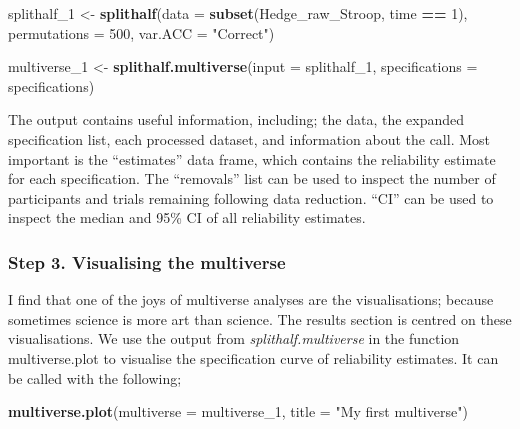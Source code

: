 \documentclass[english,man,floatsintext]{apa6}
\newenvironment{Shaded}{\begin{snugshade}}{\end{snugshade}}
\newcommand{\DataTypeTok}[1]{\textcolor[rgb]{0.13,0.29,0.53}{#1}}
\newcommand{\DecValTok}[1]{\textcolor[rgb]{0.00,0.00,0.81}{#1}}
\newcommand{\KeywordTok}[1]{\textcolor[rgb]{0.13,0.29,0.53}{\textbf{#1}}}
\newcommand{\NormalTok}[1]{#1}
\newcommand{\OperatorTok}[1]{\textcolor[rgb]{0.81,0.36,0.00}{\textbf{#1}}}
\newcommand{\StringTok}[1]{\textcolor[rgb]{0.31,0.60,0.02}{#1}}
\begin{document}
\begin{Shaded}
\begin{Highlighting}[]
\NormalTok{splithalf_}\DecValTok{1}\NormalTok{ <-}\StringTok{ }\KeywordTok{splithalf}\NormalTok{(}\DataTypeTok{data =} \KeywordTok{subset}\NormalTok{(Hedge_raw_Stroop, time }\OperatorTok{==}\StringTok{ }\DecValTok{1}\NormalTok{),}
                         \DataTypeTok{permutations =} \DecValTok{500}\NormalTok{,}
                         \DataTypeTok{var.ACC =} \StringTok{"Correct"}\NormalTok{)}

\NormalTok{multiverse_}\DecValTok{1}\NormalTok{ <-}\StringTok{ }\KeywordTok{splithalf.multiverse}\NormalTok{(}\DataTypeTok{input =}\NormalTok{ splithalf_}\DecValTok{1}\NormalTok{,}
                 \DataTypeTok{specifications =}\NormalTok{ specifications)}
\end{Highlighting}
\end{Shaded}

The output contains useful information, including; the data, the expanded specification list, each processed dataset, and information about the call. Most important is the \enquote{estimates} data frame, which contains the reliability estimate for each specification. The \enquote{removals} list can be used to inspect the number of participants and trials remaining following data reduction. \enquote{CI} can be used to inspect the median and 95\% CI of all reliability estimates.

\hypertarget{step-3.-visualising-the-multiverse}{%
\subsubsection{Step 3. Visualising the multiverse}\label{step-3.-visualising-the-multiverse}}

I find that one of the joys of multiverse analyses are the visualisations; because sometimes science is more art than science. The results section is centred on these visualisations. We use the output from \emph{splithalf.multiverse} in the function multiverse.plot to visualise the specification curve of reliability estimates. It can be called with the following;

\begin{Shaded}
\begin{Highlighting}[]
\KeywordTok{multiverse.plot}\NormalTok{(}\DataTypeTok{multiverse =}\NormalTok{ multiverse_}\DecValTok{1}\NormalTok{,}
         \DataTypeTok{title =} \StringTok{"My first multiverse"}\NormalTok{)}
\end{Highlighting}
\end{Shaded}
\end{document}
